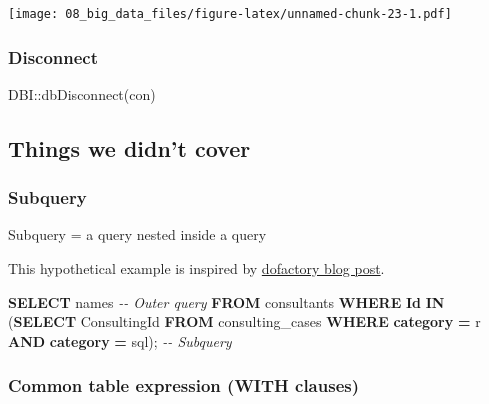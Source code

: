 \documentclass[
]{book}
\newenvironment{Shaded}{\begin{snugshade}}{\end{snugshade}}
\newcommand{\CommentTok}[1]{\textcolor[rgb]{0.56,0.35,0.01}{\textit{#1}}}
\newcommand{\FunctionTok}[1]{\textcolor[rgb]{0.00,0.00,0.00}{#1}}
\newcommand{\KeywordTok}[1]{\textcolor[rgb]{0.13,0.29,0.53}{\textbf{#1}}}
\newcommand{\NormalTok}[1]{#1}
\newcommand{\OperatorTok}[1]{\textcolor[rgb]{0.81,0.36,0.00}{\textbf{#1}}}
\newcommand{\SpecialCharTok}[1]{\textcolor[rgb]{0.00,0.00,0.00}{#1}}
\newcommand{\StringTok}[1]{\textcolor[rgb]{0.31,0.60,0.02}{#1}}
\begin{document}
\texttt{[image: 08\_big\_data\_files/figure-latex/unnamed-chunk-23-1.pdf]}

\hypertarget{disconnect}{%
\subsubsection{Disconnect}\label{disconnect}}

\begin{Shaded}
\begin{Highlighting}[]
\NormalTok{DBI}\SpecialCharTok{::}\FunctionTok{dbDisconnect}\NormalTok{(con)}
\end{Highlighting}
\end{Shaded}

\hypertarget{things-we-didnt-cover}{%
\subsection{Things we didn't cover}\label{things-we-didnt-cover}}

\hypertarget{subquery}{%
\subsubsection{Subquery}\label{subquery}}

Subquery = a query nested inside a query

This hypothetical example is inspired by \href{https://www.dofactory.com/sql/subquery}{dofactory blog post}.

\begin{Shaded}
\begin{Highlighting}[]
\KeywordTok{SELECT}\NormalTok{ names  }\CommentTok{{-}{-} Outer query }
\KeywordTok{FROM}\NormalTok{ consultants}
\KeywordTok{WHERE} \KeywordTok{Id} \KeywordTok{IN}\NormalTok{ (}\KeywordTok{SELECT}\NormalTok{ ConsultingId}
                \KeywordTok{FROM}\NormalTok{ consulting\_cases }
                \KeywordTok{WHERE} \KeywordTok{category} \OperatorTok{=} \StringTok{\textquotesingle{}r\textquotesingle{}} \KeywordTok{AND} \KeywordTok{category} \OperatorTok{=} \StringTok{\textquotesingle{}sql\textquotesingle{}}\NormalTok{); }\CommentTok{{-}{-} Subquery }
\end{Highlighting}
\end{Shaded}

\hypertarget{common-table-expression-with-clauses}{%
\subsubsection{Common table expression (WITH clauses)}\label{common-table-expression-with-clauses}}
\end{document}
